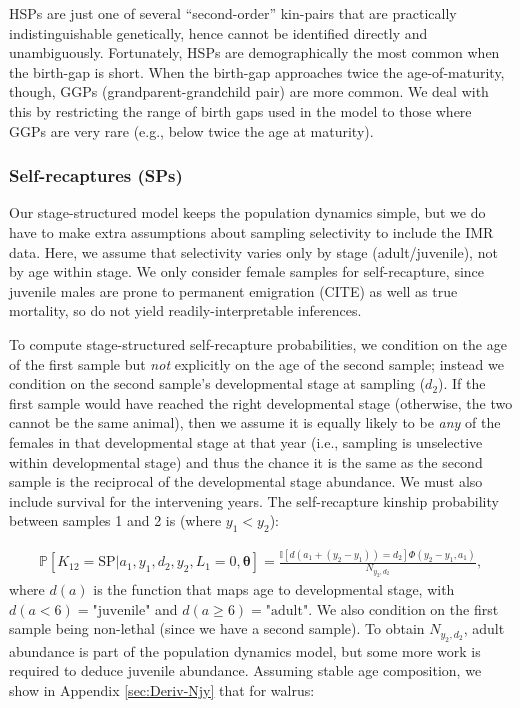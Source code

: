 HSPs are just one of several ``second-order'' kin-pairs that are
practically indistinguishable genetically, hence cannot be identified
directly and unambiguously. Fortunately, HSPs are demographically
the most common when the birth-gap is short. When the birth-gap approaches
twice the age-of-maturity, though, GGPs (grandparent-grandchild pair)
are more common. We deal with this by restricting the range of birth
gaps used in the model to those where GGPs are very rare (e.g., below
twice the age at maturity).

\subsubsection{Self-recaptures (SPs)\label{subsec:selfPs}}

Our stage-structured model keeps the population dynamics simple, but
we do have to make extra assumptions about sampling selectivity to
include the IMR data. Here, we assume that selectivity varies only
by stage (adult/juvenile), not by age within stage. We only consider
female samples for self-recapture, since juvenile males are prone
to \textquotedbl permanent emigration\textquotedbl{} (CITE) as well
as true mortality, so do not yield readily-interpretable inferences.

To compute stage-structured self-recapture probabilities, we condition
on the age of the first sample but \emph{not} explicitly on the age
of the second sample; instead we condition on the second sample's
developmental stage at sampling ($d_{2}$). If the first sample would
have reached the right developmental stage (otherwise, the two cannot
be the same animal), then we assume it is equally likely to be \emph{any}
of the females in that developmental stage at that year (i.e., sampling
is unselective within developmental stage) and thus the chance it
is the same as the second sample is the reciprocal of the developmental
stage abundance. We must also include survival for the intervening
years. The self-recapture kinship probability between samples 1 and
2 is (where $y_{1}<y_{2}$):

\begin{gather}
\mathbb{P}\left[K_{12}=\text{SP}\vert a_{1},y_{1},d_{2},y_{2},L_{1}=0,\boldsymbol{\theta}\right]=\frac{\mathbb{I}\left[d\left(a_{1}+\left(y_{2}-y_{1}\right)\right)=d_{2}\right]\Phi\left(y_{2}-y_{1},a_{1}\right)}{N_{y_{2},d_{2}}},\label{eq:self-staged}
\end{gather}
where $d\left(a\right)$ is the function that maps age to developmental
stage, with $d\left(a<6\right)=\text{"juvenile"}$ and $d\left(a\geqslant6\right)=\text{"adult"}$.
We also condition on the first sample being non-lethal (since we have
a second sample). To obtain $N_{y_{2},d_{2}}$, adult abundance is
part of the population dynamics model, but some more work is required
to deduce juvenile abundance. Assuming stable age composition, we
show in Appendix \ref{sec:Deriv-Njy} that for walrus:

